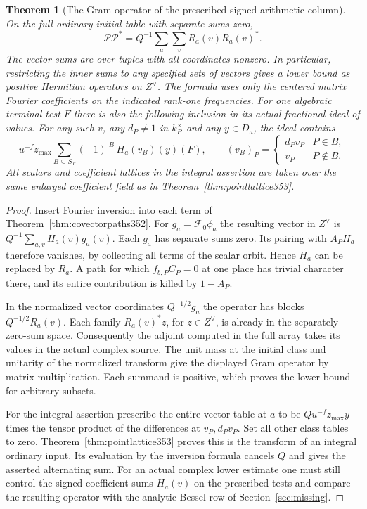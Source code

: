\documentclass[a4paper,11pt]{article}
\newtheorem{theorem}[proposition]{Theorem}
\theoremstyle{definition}
\theoremstyle{remark}
\numberwithin{equation}{section}
\begin{document}
\begin{theorem}[The Gram operator of the prescribed signed arithmetic column]\leavevmode
\label{thm:rankone354}
On the full ordinary initial table with separate sums zero,
\[
       \mathcal P\mathcal P^*
         = Q^{-1}\sum_a\sum_{v}R_a(v)R_a(v)^* .
\]
The vector sums are over tuples with all coordinates nonzero.
In particular, restricting the inner sums to any specified sets
of vectors gives a lower bound as positive Hermitian operators
on \(Z^\vee\). The formula uses only the centered matrix
Fourier coefficients on the indicated rank-one frequencies.
For one algebraic terminal test \(F\) there is also the
following inclusion in its actual fractional ideal of values.
For any such \(v\), any \(d_P\ne1\) in \(k_P^\times\) and
any \(y\in D_a\), the ideal contains
\[
    u^{-f} z_{\max}
      \sum_{B\subseteq S_T}(-1)^{|B|}H_a(v_B)(y)(F),
    \qquad (v_B)_P=
     \begin{cases} d_P v_P& P\in B,\\ v_P& P\notin B .\end{cases}
\]
All scalars and coefficient lattices in the integral assertion
are taken over the same enlarged coefficient field as in
Theorem~\ref{thm:pointlattice353}.
\end{theorem}
\begin{proof}
Insert Fourier inversion into each term of
Theorem~\ref{thm:covectorpaths352}. For \(g_a=\mathcal F_0\phi_a\)
the resulting vector in \(Z^\vee\) is
\(Q^{-1}\sum_{a,v} H_a(v) g_a(v)\). Each \(g_a\) has separate
sums zero. Its pairing with \(A_P H_a\) therefore vanishes,
by collecting all terms of the scalar orbit. Hence \(H_a\)
can be replaced by \(R_a\). A path for which \(f_{b,P}C_P=0\)
at one place has trivial character there, and its entire
contribution is killed by \(1-A_P\).

In the normalized vector coordinates \(Q^{-1/2}g_a\) the
operator has blocks \(Q^{-1/2}R_a(v)\). Each family
\(R_a(v)^*z\), for \(z\in Z^\vee\), is already in the
separately zero-sum space. Consequently the adjoint computed
in the full array takes its values in the actual complex
source. The unit mass at the initial class and unitarity of
the normalized transform give the displayed Gram operator
by matrix multiplication. Each summand is positive, which
proves the lower bound for arbitrary subsets.

For the integral assertion prescribe the entire vector table
at \(a\) to be \(Q u^{-f}z_{\max}y\) times the tensor product
of the differences at \(v_P,d_Pv_P\). Set all other class
tables to zero. Theorem~\ref{thm:pointlattice353} proves this
is the transform of an integral ordinary input. Its evaluation
by the inversion formula cancels \(Q\) and gives the asserted
alternating sum. For an actual complex lower estimate one
must still control the signed coefficient sums \(H_a(v)\)
on the prescribed tests and compare the resulting operator
with the analytic Bessel row of Section~\ref{sec:missing}.
\end{proof}
\end{document}
